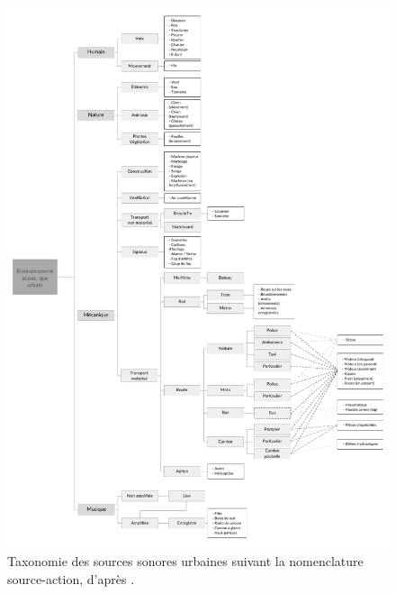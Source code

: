 \begin{figure}[t]
        \myfloatalign
        \includegraphics[width=\linewidth]{gfx/ch_3/categoSalamon}
        \caption[Taxonomie des sources sonores urbaines suivant la nomenclature source-action.]{Taxonomie des sources sonores urbaines suivant la nomenclature source-action, d'après \citep{Salamon14}.}\label{fig:catSoundscapeSalamon}
\end{figure}

